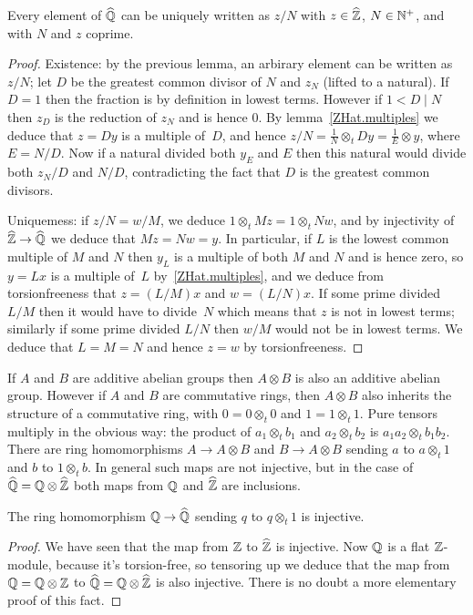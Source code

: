 \begin{lemma}
    \label{QHat.lowestTerms}
    \leanok
    Every element of $\widehat{\mathbb{Q}}$ can be uniquely written as $z/N$ with $z\in\widehat{\mathbb{Z}}$, $N\in\mathbb{N}^+$,
    and with $N$ and $z$ coprime.
\end{lemma}
\begin{proof}
    Existence: by the previous lemma, an arbirary element can be written as $z/N$; let $D$
    be the greatest common divisor of $N$ and $z_N$ (lifted to a natural). If $D=1$ 
    then the fraction is by definition in lowest terms. However if $1<D\mid N$ then $z_D$
    is the reduction of $z_N$ and is hence 0. By lemma~\ref{ZHat.multiples} we deduce that $z=Dy$
    is a multiple of~$D$, and hence $z/N=\frac{1}{N}\otimes_tDy=\frac{1}{E}\otimes y$, where
    $E=N/D$. Now if a natural divided both $y_E$ and $E$ then this natural would divide both $z_N/D$
    and $N/D$, contradicting the fact that $D$ is the greatest common divisors.
    
    Uniquemess: if $z/N=w/M$, we deduce $1\otimes_t Mz=1\otimes_t Nw$,
    and by injectivity of $\widehat{\mathbb{Z}}\to\widehat{\mathbb{Q}}$ we deduce that $Mz=Nw=y$.
    In particular, if $L$ is the lowest common multiple of $M$ and $N$ then $y_L$ is a multiple of both $M$ and $N$ and is
    hence zero, so $y=Lx$ is a multiple of~$L$ by~\ref{ZHat.multiples}, and we deduce
    from torsionfreeness that $z=(L/M)x$ and $w=(L/N)x$. If some prime divided $L/M$
    then it would have to divide~$N$ which means that $z$ is not in lowest terms;
    similarly if some prime divided $L/N$ then $w/M$ would not be in lowest terms.
    We deduce that $L=M=N$ and hence $z=w$ by torsionfreeness.
\end{proof}

If $A$ and $B$ are additive abelian groups then $A\otimes B$ is also an additive abelian group.
However if $A$ and $B$ are commutative rings, then $A\otimes B$ also inherits the structure
of a commutative ring, with $0=0\otimes_t 0$ and $1=1\otimes_t 1$. Pure tensors multiply in the 
obvious way: the product of $a_1\otimes_t b_1$ and $a_2\otimes_t b_2$ is $a_1a_2\otimes_t b_1b_2.$
There are ring homomorphisms $A\to A\otimes B$ and $B\to A\otimes B$ sending $a$ to $a\otimes_t 1$
and $b$ to $1\otimes_t b$. In general such maps are not injective, but in the case of
$\widehat{\mathbb{Q}}=\mathbb{Q}\otimes\widehat{\mathbb{Z}}$ both maps from $\mathbb{Q}$ and $\widehat{\mathbb{Z}}$ are inclusions.

\begin{lemma}
    \label{QHat.injective_rat}
    \leanok
    The ring homomorphism $\mathbb{Q}\to\widehat{\mathbb{Q}}$ sending $q$ to $q\otimes_t 1$
    is injective.
\end{lemma}
\begin{proof} We have seen that the map from $\mathbb{Z}$ to $\widehat{\mathbb{Z}}$ is
    injective. Now $\mathbb{Q}$ is a flat $\mathbb{Z}$-module, because it's
    torsion-free, so tensoring up we deduce that the map
    from $\mathbb{Q}=\mathbb{Q}\otimes\mathbb{Z}$ to $\widehat{\mathbb{Q}}=\mathbb{Q}\otimes\widehat{\mathbb{Z}}$ is also injective.
    There is no doubt a more elementary proof of this fact.
\end{proof}

